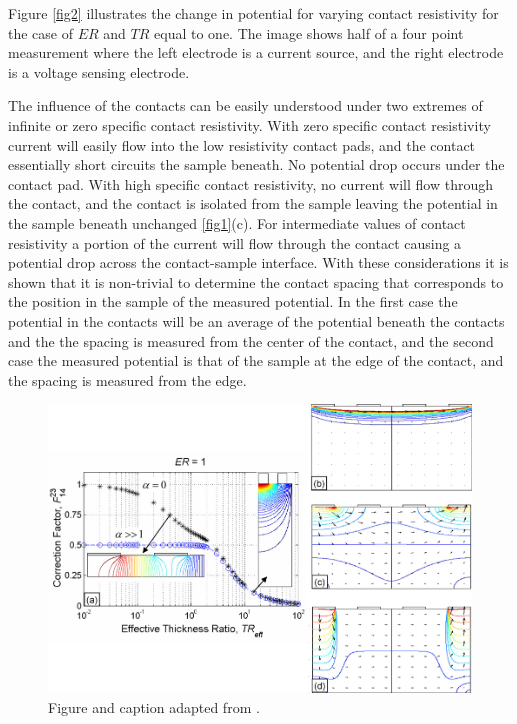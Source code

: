 Figure \ref{fig2} illustrates the change in potential for varying contact resistivity for the case of $ER$ and $TR$ equal to one. The image shows half of a four point measurement where the left electrode is a current source, and the right electrode is a voltage sensing electrode. 

The influence of the contacts can be easily understood under two extremes of infinite or zero specific contact resistivity. With zero specific contact resistivity current will easily flow into the low resistivity contact pads, and the contact essentially short circuits the sample beneath. No potential drop occurs under the contact pad. With high specific contact resistivity, no current will flow through the contact, and the contact is isolated from the sample leaving the potential in the sample beneath unchanged \ref{fig1}(c). For intermediate values of contact resistivity a portion of the current will flow through the contact causing a potential drop across the contact-sample interface.
With these considerations it is shown that it is non-trivial  to determine the contact spacing that corresponds to the position in the sample of the measured potential. In the first case the potential in the contacts will be an average of the potential beneath the contacts \cite{Zimney2007CorrectionStudy} %
and the the spacing is measured from the center of the contact, and the second case the measured potential is that of the sample at the edge of the contact, and the spacing is measured from the edge.



\begin{figure}[t]
  \centering
    \includegraphics[width=\textwidth]{fig/4pp/ER1.png}
 \caption{  Figure and caption adapted from \cite{Zimney2007CorrectionStudy}.}
 \label{ER1}
\end{figure}



